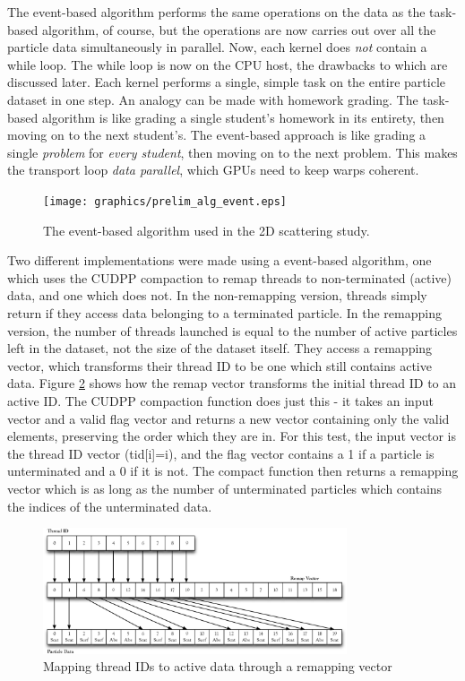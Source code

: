 The event-based algorithm performs the same operations on the data as the task-based algorithm, of course, but the operations are now carries out over all the particle data simultaneously in parallel.  Now, each kernel does \emph{not} contain a while loop.  The while loop is now on the CPU host, the drawbacks to which are discussed later.  Each kernel performs a single, simple task on the entire particle dataset in one step.  An analogy can be made with homework grading.  The task-based algorithm is like grading a single student's homework in its entirety, then moving on to the next student's.  The event-based approach is like grading a single \emph{problem} for \emph{every student}, then moving on to the next problem.  This makes the transport loop \emph{data parallel}, which GPUs need to keep warps coherent. 

\begin{figure}[h!] 
  \centering
    \texttt{[image: graphics/prelim\_alg\_event.eps]}
     \caption{The event-based algorithm used in the 2D scattering study. \label{prelim_alg_event} }
\end{figure}

Two different implementations were made using a event-based algorithm, one which uses the CUDPP compaction to remap threads to non-terminated (active) data, and one which does not.  In the non-remapping version, threads simply return if they access data belonging to a terminated particle.  In the remapping version, the number of threads launched is equal to the number of active particles left in the dataset, not the size of the dataset itself.  They access a remapping vector, which transforms their thread ID to be one which still contains active data.  Figure \ref{remapping} shows how the remap vector transforms the initial thread ID to an active ID.  The CUDPP compaction function does just this - it takes an input vector and a valid flag vector and returns a new vector containing only the valid elements, preserving the order which they are in.  For this test, the input vector is the thread ID vector (tid[i]=i), and the flag vector contains a 1 if a particle is unterminated and a 0 if it is not.  The compact function then returns a remapping vector which is as long as the number of unterminated particles which contains the indices of the unterminated data.

\begin{figure}[h!] 
  \centering
    \includegraphics[width=0.8\textwidth]{graphics/remapping_horiz.eps}
     \caption{Mapping thread IDs to active data through a remapping vector \label{remapping} }
\end{figure}

